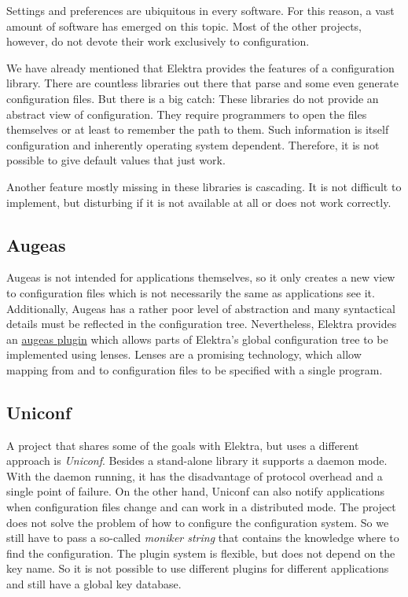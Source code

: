 Settings and preferences are ubiquitous in every software. For this reason, a vast amount of software has emerged on this topic. Most of the other projects, however, do not devote their work exclusively to configuration.

We have already mentioned that Elektra provides the features of a configuration library. There are countless libraries out there that parse and some even generate configuration files. But there is a big catch\+: These libraries do not provide an abstract view of configuration. They require programmers to open the files themselves or at least to remember the path to them. Such information is itself configuration and inherently operating system dependent. Therefore, it is not possible to give default values that just work.

Another feature mostly missing in these libraries is cascading. It is not difficult to implement, but disturbing if it is not available at all or does not work correctly.

\subsection*{Augeas}

Augeas is not intended for applications themselves, so it only creates a new view to configuration files which is not necessarily the same as applications see it. Additionally, Augeas has a rather poor level of abstraction and many syntactical details must be reflected in the configuration tree. Nevertheless, Elektra provides an \hyperlink{md_src_plugins_augeas_README_src_plugins_augeas_README_md}{augeas plugin} which allows parts of Elektra's global configuration tree to be implemented using lenses. Lenses are a promising technology, which allow mapping from and to configuration files to be specified with a single program.

\subsection*{Uniconf}

A project that shares some of the goals with Elektra, but uses a different approach is {\itshape Uniconf}. Besides a stand-\/alone library it supports a daemon mode. With the daemon running, it has the disadvantage of protocol overhead and a single point of failure. On the other hand, Uniconf can also notify applications when configuration files change and can work in a distributed mode. The project does not solve the problem of how to configure the configuration system. So we still have to pass a so-\/called {\itshape moniker string} that contains the knowledge where to find the configuration. The plugin system is flexible, but does not depend on the key name. So it is not possible to use different plugins for different applications and still have a global key database.

